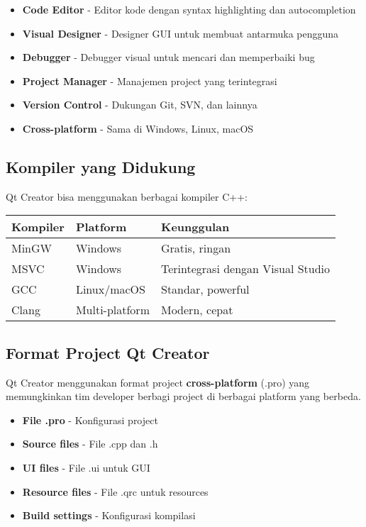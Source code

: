 \begin{itemize}
\item \textbf{Code Editor} - Editor kode dengan syntax highlighting dan autocompletion
\item \textbf{Visual Designer} - Designer GUI untuk membuat antarmuka pengguna
\item \textbf{Debugger} - Debugger visual untuk mencari dan memperbaiki bug
\item \textbf{Project Manager} - Manajemen project yang terintegrasi
\item \textbf{Version Control} - Dukungan Git, SVN, dan lainnya
\item \textbf{Cross-platform} - Sama di Windows, Linux, macOS
\end{itemize}

\subsection{Kompiler yang Didukung}

Qt Creator bisa menggunakan berbagai kompiler C++:

\begin{center}
\begin{tabular}{|l|l|l|}
\hline
\textbf{Kompiler} & \textbf{Platform} & \textbf{Keunggulan} \\
\hline
MinGW & Windows & Gratis, ringan \\
\hline
MSVC & Windows & Terintegrasi dengan Visual Studio \\
\hline
GCC & Linux/macOS & Standar, powerful \\
\hline
Clang & Multi-platform & Modern, cepat \\
\hline
\end{tabular}
\end{center}

\subsection{Format Project Qt Creator}

Qt Creator menggunakan format project \textbf{cross-platform} (.pro) yang memungkinkan tim developer berbagi project di berbagai platform yang berbeda.

\begin{itemize}
\item \textbf{File .pro} - Konfigurasi project
\item \textbf{Source files} - File .cpp dan .h
\item \textbf{UI files} - File .ui untuk GUI
\item \textbf{Resource files} - File .qrc untuk resources
\item \textbf{Build settings} - Konfigurasi kompilasi
\end{itemize}

